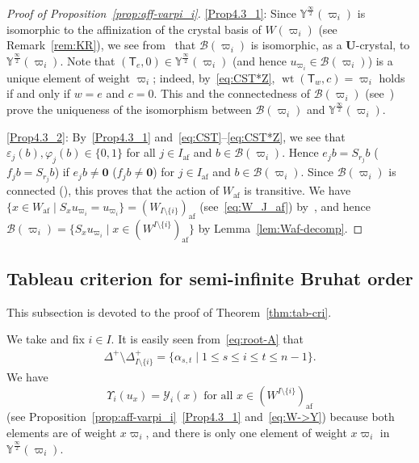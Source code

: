 \documentclass[10pt]{amsart}
\theoremstyle{definition}\newtheorem{defi}[theo]{Definition}
\theoremstyle{remark}\newtheorem{rema}[theo]{Remark}
\newcommand\bm[1]{\boldsymbol{#1}}
\newcommand{\U}{\mathbf{U}}
\newcommand{\si}{\frac{\infty}{2}}
\DeclareMathOperator{\af}{af}
\DeclareMathOperator{\wt}{wt}
\begin{document}
\begin{proof}[Proof of Proposition~\ref{prop:aff-varpi_i}]
\ref{Prop4.3_1}: 
Since 
$\mathbb{Y}^{\si}(\varpi_i)$ 
is isomorphic to the affinization of the crystal basis of 
$W(\varpi_i)$ (see Remark~\ref{rem:KR}), 
we see from~\cite[Proposition~5.4~(ii) and Theorem~5.17~(vii)]{K02}
that 
$\mathcal{B}(\varpi_i)$
is isomorphic, as a $\U$-crystal, to 
$\mathbb{Y}^{\si}(\varpi_i)$. 
Note that 
$(\mathsf{T}_e , 0) \in \mathbb{Y}^{\si}(\varpi_i)$ 
(and hence $u_{\varpi_i} \in \mathcal{B}(\varpi_i)$)
is a unique element of weight $\varpi_i$; 
indeed, by~\eqref{eq:CST*Z}, 
$\wt (\mathsf{T}_w,c) = \varpi_i$ 
holds if and only if 
$w = e$ and $c = 0$.
This and the connectedness of 
$\mathcal{B}(\varpi_i)$ 
(see~\cite[Proposition~5.4~(ii)]{K02})
prove the uniqueness of the isomorphism between 
$\mathcal{B}(\varpi_i)$
and 
$\mathbb{Y}^{\si}(\varpi_i)$.

\ref{Prop4.3_2}: 
By~\ref{Prop4.3_1} and~\eqref{eq:CST}--\eqref{eq:CST*Z}, we see that 
$\varepsilon_j(b) , \varphi_j(b) \in \{ 0,1 \}$ 
for all 
$j \in I_{\af}$ 
and 
$b \in \mathcal{B}(\varpi_i)$. 
Hence 
$e_j b = S_{r_j} b$
(\resp $f_j b = S_{r_j} b$) 
if 
$e_j b \neq \bm{0}$
(\resp $f_j b\neq \bm{0}$)
for $j \in I_{\af}$ and $b \in \mathcal{B}(\varpi_i)$. 
Since 
$\mathcal{B}(\varpi_i)$
is connected 
(\cite[Proposition~5.4~(ii)]{K02}), 
this proves that the action of 
$W_{\af}$ 
is transitive. 
We have 
$\{ x \in W_{\af} \mid S_x u_{\varpi_i} = u_{\varpi_i} \} = (W_{I \setminus \{ i \}})_{\af}$
(see~\eqref{eq:W_J_af}) 
by~\cite[Proposition~5.1.1]{INS16}, and hence 
$\mathcal{B}(\varpi_i) = \{ S_x u_{\varpi_i} \mid x \in (W^{I \setminus \{ i \}})_{\af} \}$
by Lemma~\ref{lem:Waf-decomp}. 
\end{proof}

\subsection{Tableau criterion for semi-infinite Bruhat order} \label{Subsection:tab-cri}

This subsection is devoted to the proof of Theorem~\ref{thm:tab-cri}.

We take and fix 
$i \in I$. 
It is easily seen from~\eqref{eq:root-A} that
\begin{align} \label{eq:Delta^i}
\Delta^+ \setminus \Delta_{I \setminus \{ i \}}^+
=
\{ \alpha_{s,t} \mid 1 \leq s \leq i \leq t \leq n-1 \} .
\end{align}
We have 
\begin{equation}
\Upsilon_i(u_x) = \mathcal{Y}_i(x)\text{ for all }x \in (W^{I \setminus \{ i \}})_{\af}
\end{equation} 
(see Proposition~\ref{prop:aff-varpi_i}~\ref{Prop4.3_1} and~\eqref{eq:W->Y}) 
because both elements are of weight $x\varpi_i$, 
and there is only one element of weight $x\varpi_i$ in 
$\mathbb{Y}^{\si}(\varpi_i)$.
\end{document}
